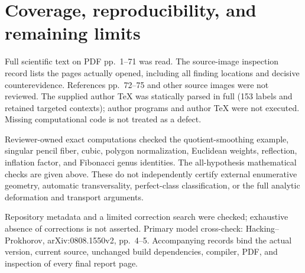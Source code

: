 \documentclass[10pt]{article}
\begin{document}
\section*{Coverage, reproducibility, and remaining limits}
Full scientific text on PDF pp. 1–71 was read. The source-image inspection record lists the pages actually opened, including all finding locations and decisive counterevidence. References pp. 72–75 and other source images were not reviewed. The supplied author TeX was statically parsed in full (153 labels and retained targeted contexts); author programs and author TeX were not executed. Missing computational code is not treated as a defect.\par
Reviewer-owned exact computations checked the quotient-smoothing example, singular pencil fiber, cubic, polygon normalization, Euclidean weights, reflection, inflation factor, and Fibonacci genus identities. The all-hypothesis mathematical checks are given above. These do not independently certify external enumerative geometry, automatic transversality, perfect-class classification, or the full analytic deformation and transport arguments.\par
Repository metadata and a limited correction search were checked; exhaustive absence of corrections is not asserted. Primary model cross-check: Hacking–Prokhorov, arXiv:0808.1550v2, pp. 4–5. Accompanying records bind the actual version, current source, unchanged build dependencies, compiler, PDF, and inspection of every final report page.\par
\end{document}
